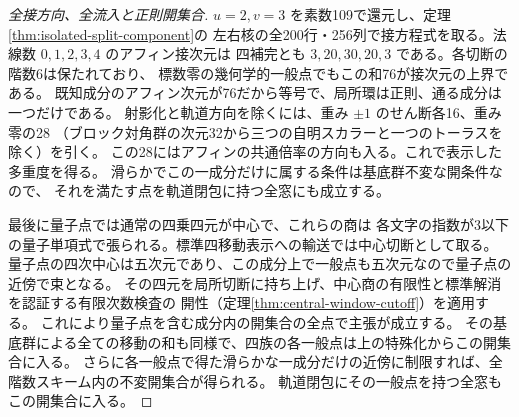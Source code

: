 \begin{proof}[全接方向、全流入と正則開集合]
$u=2,v=3$ を素数109で還元し、定理\ref{thm:isolated-split-component}の
左右核の全200行・256列で接方程式を取る。法線数 $0,1,2,3,4$ のアフィン接次元は
四補完とも $3,20,30,20,3$ である。各切断の階数6は保たれており、
標数零の幾何学的一般点でもこの和76が接次元の上界である。
既知成分のアフィン次元が76だから等号で、局所環は正則、通る成分は一つだけである。
射影化と軌道方向を除くには、重み $\pm1$ のせん断各16、重み零の28
（ブロック対角群の次元32から三つの自明スカラーと一つのトーラスを除く）を引く。
この28にはアフィンの共通倍率の方向も入る。これで表示した多重度を得る。
滑らかでこの一成分だけに属する条件は基底群不変な開条件なので、
それを満たす点を軌道閉包に持つ全窓にも成立する。

最後に量子点では通常の四乗四元が中心で、これらの商は
各文字の指数が3以下の量子単項式で張られる。標準四移動表示への輸送では中心切断として取る。
量子点の四次中心は五次元であり、この成分上で一般点も五次元なので量子点の近傍で束となる。
その四元を局所切断に持ち上げ、中心商の有限性と標準解消を認証する有限次数検査の
開性（定理\ref{thm:central-window-cutoff}）を適用する。
これにより量子点を含む成分内の開集合の全点で主張が成立する。
その基底群による全ての移動の和も同様で、四族の各一般点は上の特殊化からこの開集合に入る。
さらに各一般点で得た滑らかな一成分だけの近傍に制限すれば、全階数スキーム内の不変開集合が得られる。
軌道閉包にその一般点を持つ全窓もこの開集合に入る。
\end{proof}
